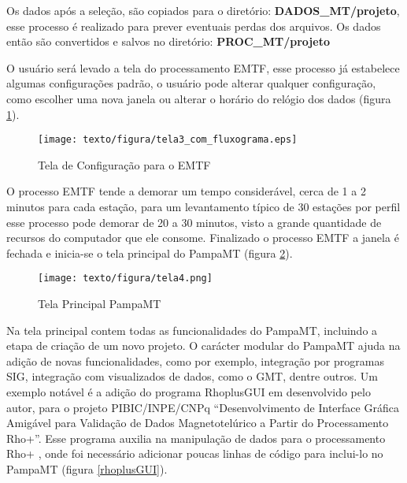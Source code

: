     Os dados após a seleção, são copiados para o diretório: \textbf{DADOS\_MT/projeto}, esse processo é realizado para prever eventuais perdas dos arquivos. Os dados então são convertidos e salvos no diretório: \textbf{PROC\_MT/projeto} 
    
    O usuário será levado a tela do processamento EMTF, esse processo já estabelece algumas configurações padrão, o usuário pode alterar qualquer configuração, como escolher uma nova janela ou alterar o horário do relógio dos dados (figura \ref{conf-procZ}).
    
    \begin{figure}[H]
        \caption{Tela de Configuração para o EMTF}
            \begin{center}
                \texttt{[image: texto/figura/tela3\_com\_fluxograma.eps]}
            \end{center}
        \label{conf-procZ}
    \end{figure}
    
    O processo EMTF tende a demorar um tempo considerável, cerca de 1 a 2 minutos para cada estação, para um levantamento típico de 30 estações por perfil esse processo pode demorar de 20 a 30 minutos, visto a grande quantidade de recursos do computador que ele consome. Finalizado o processo EMTF a janela é fechada e inicia-se o tela principal do PampaMT (figura \ref{tela-prin}).
    
    \begin{figure}[H]
        \caption{Tela Principal PampaMT}
            \begin{center}
                \texttt{[image: texto/figura/tela4.png]}
            \end{center}
        \label{tela-prin}
    \end{figure}
    
    
    Na tela principal contem todas as funcionalidades do PampaMT, incluindo a etapa de criação de um novo projeto. O carácter modular do PampaMT ajuda na adição de novas funcionalidades, como por exemplo, integração por programas SIG, integração com visualizados de dados, como o GMT, dentre outros. Um exemplo notável é a adição do programa RhoplusGUI em desenvolvido pelo autor, para o projeto PIBIC/INPE/CNPq ``Desenvolvimento de Interface Gráfica Amigável para Validação de Dados Magnetotelúrico a Partir do Processamento Rho+''. Esse programa auxilia na manipulação de dados para o processamento Rho+ \cite{parker1996optimal}, onde foi necessário adicionar poucas linhas de código para inclui-lo no PampaMT (figura \ref{rhoplusGUI}).
    
